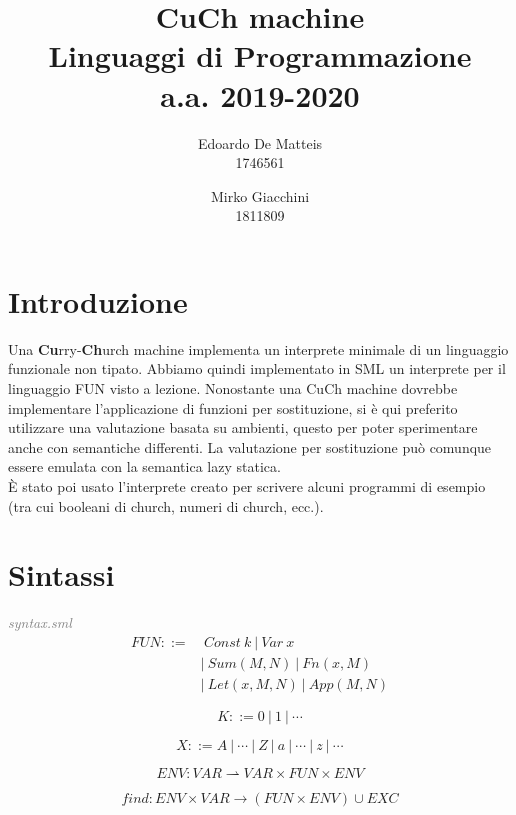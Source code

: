 \documentclass[a4paper]{article}
\title{%
	CuCh machine \\
  	\large Linguaggi di Programmazione \\ 
	a.a. 2019-2020}
\author{Edoardo De Matteis  \\ 1746561 
   \and Mirko Giacchini \\ 1811809 }
\date{}
\begin{document}
	\maketitle
	\tableofcontents
	
	\section{Introduzione}
	Una \textbf{Cu}rry-\textbf{Ch}urch machine implementa un interprete minimale di un linguaggio funzionale non tipato. Abbiamo quindi implementato in SML un interprete per il linguaggio FUN visto a lezione. Nonostante una CuCh machine dovrebbe implementare l'applicazione di funzioni per sostituzione, si è qui preferito utilizzare una valutazione basata su ambienti, questo per poter sperimentare anche con semantiche differenti. La valutazione per sostituzione può comunque essere emulata con la semantica lazy statica.\\
È stato poi usato l'interprete creato per scrivere alcuni programmi di esempio (tra cui booleani di church, numeri di church, ecc.).
	\section{Sintassi}
	\textit{\textcolor{gray}{syntax.sml}} \\
	 
	\begin{equation} \label{fun}
	\begin{split}
		FUN ::= & \ Const \ k \ |\ Var \ x \\
			&|\ Sum(M, N) \ |\ Fn(x, M) \\ 
			&|\ Let(x, M, N) \ |\ App(M, N) 
	\end{split}
	\end{equation}

	\begin{equation}
		K ::= 0 \ | \ 1 \ | \ \cdots
	\end{equation}
	
	\begin{equation}
		X ::= A \ | \ \cdots \ | \ Z \ | \ a \ | \ \cdots \ | \ z \ | \ \cdots
	\end{equation}

	\begin{equation} \label{env}
		ENV : VAR \rightharpoonup VAR \times FUN \times ENV
	\end{equation}

	\begin{equation} \label{find}
		find: ENV \times VAR \rightarrow (FUN \times ENV) \cup EXC
	\end{equation}
	
\end{document}
